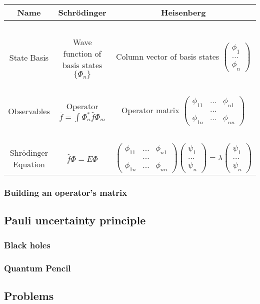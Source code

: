 		\begin{tabular}{c | c | c }
			Name & Schr\"odinger & Heisenberg \\
			\hline
			\hline
			\ &&\\
			
			 State Basis & Wave function of basis states $ \{ \Phi_n \} $ & Column vector of basis states $\begin{pmatrix}\phi_1\\...\\ \phi_n\end{pmatrix}$ \\[3ex]		
			\hline
			\hline
			\ &&\\
			
			Observables & Operator $ \bar{f} = \int \Phi_n^* \hat{f} \Phi_m$ & Operator matrix $\begin{pmatrix}\phi_{11} & ... & \phi_{n1} \\ & ... & \\ \phi_{1n} & ... & \phi_{nn}\end{pmatrix}$ \\[3ex]
			\hline
			\hline
			
			\ &&\\
			Shr\"odinger Equation & $ \hat{f}\Phi =  E \Phi$ & $\begin{pmatrix}\phi_{11} & ... & \phi_{n1} \\ & ... & \\ \phi_{1n} & ... & \phi_{nn}\end{pmatrix} \begin{pmatrix}\psi_1\\...\\ \psi_n\end{pmatrix} = \lambda \begin{pmatrix}\psi_1\\...\\ \psi_n\end{pmatrix}$ \\[3ex]
			\hline
			\hline			
		\end{tabular}
	
		\subsubsection{Building an operator's matrix}
		
	
	\subsection{Pauli uncertainty principle}
		
		\subsubsection{Black holes}
		\subsubsection{Quantum Pencil}
			\cite{easton2007quantum}
		
	\subsection{Problems}